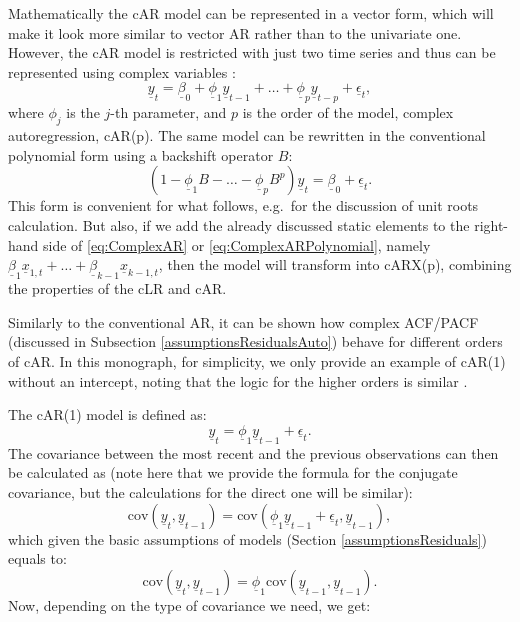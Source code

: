 \documentclass[
]{book}
\begin{document}
Mathematically the cAR model can be represented in a vector form, which will make it look more similar to vector AR rather than to the univariate one. However, the cAR model is restricted with just two time series and thus can be represented using complex variables \citep[this is also discussed in][]{Chandna2014}:
\begin{equation}
    \underline{y}_t = \underline{\beta}_0 + \underline{\phi}_1 \underline{y}_{t-1} + \dots + \underline{\phi}_p \underline{y}_{t-p} + \underline{\epsilon}_t ,
    \label{eq:ComplexAR}
\end{equation}
where \(\phi_j\) is the \(j\)-th parameter, and \(p\) is the order of the model, complex autoregression, cAR(p). The same model can be rewritten in the conventional polynomial form using a backshift operator \(B\):
\begin{equation}
    \left(1 - \underline{\phi}_1 B - \dots - \underline{\phi}_p B^p \right) \underline{y}_t  = \underline{\beta}_0 + \underline{\epsilon}_t .
    \label{eq:ComplexARPolynomial}
\end{equation}
This form is convenient for what follows, e.g.~for the discussion of unit roots calculation. But also, if we add the already discussed static elements to the right-hand side of \eqref{eq:ComplexAR} or \eqref{eq:ComplexARPolynomial}, namely \(\underline{\beta}_1 \underline{x}_{1,t} + \dots + \underline{\beta}_{k-1} \underline{x}_{k-1,t}\), then the model will transform into cARX(p), combining the properties of the cLR and cAR.

Similarly to the conventional AR, it can be shown how complex ACF/PACF (discussed in Subsection \ref{assumptionsResidualsAuto}) behave for different orders of cAR. In this monograph, for simplicity, we only provide an example of cAR(1) without an intercept, noting that the logic for the higher orders is similar \citep[ has similar derivations for the real-valued AR(p) in Section 8.3]{SvetunkovAdam}.

The cAR(1) model is defined as:
\begin{equation}
    \underline{y}_t = \underline{\phi}_1 \underline{y}_{t-1} + \underline{\epsilon}_t .
    \label{eq:ComplexAR1Step1}
\end{equation}
The covariance between the most recent and the previous observations can then be calculated as (note here that we provide the formula for the conjugate covariance, but the calculations for the direct one will be similar):
\begin{equation}
    \mathrm{cov} \left(\underline{y}_t, \underline{y}_{t-1} \right) = \mathrm{cov} \left(\underline{\phi}_1 \underline{y}_{t-1} + \underline{\epsilon}_t, \underline{y}_{t-1} \right) ,
    \label{eq:ComplexAR1Step2}
\end{equation}
which given the basic assumptions of models (Section \ref{assumptionsResiduals}) equals to:
\begin{equation}
    \mathrm{cov} \left(\underline{y}_t, \underline{y}_{t-1} \right) = \underline{\phi}_1 \mathrm{cov} \left( \underline{y}_{t-1}, \underline{y}_{t-1} \right) .
    \label{eq:ComplexAR1Step3}
\end{equation}
Now, depending on the type of covariance we need, we get:
\end{document}
